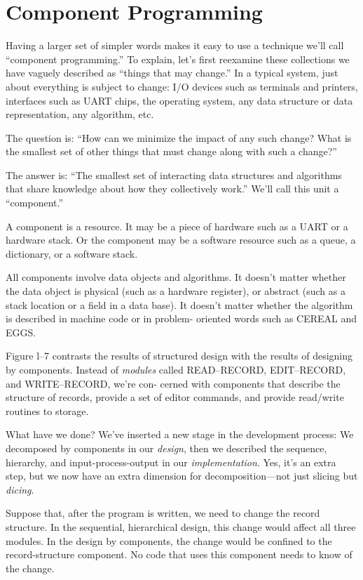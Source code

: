 \section*{Component Programming}

Having a larger set of simpler words makes it easy to use a technique
we'll call ``component programming.'' To explain, let's first reexamine
these collections we have vaguely described as ``things that may change.''
In a typical system, just about everything is subject to change: I/O
devices such as terminals and printers, interfaces such as UART chips,
the operating system, any data structure or data representation, any
algorithm, etc.

The question is: ``How can we minimize the impact of any such change?
What is the smallest set of other things that must change along with
such a change?''

The answer is: ``The smallest set of interacting data structures and
algorithms that share knowledge about how they collectively work.''
We'll call this unit a ``component.''

A component is a resource. It may be a piece of hardware such as a
UART or a hardware stack. Or the component may be a software resource
such as a queue, a dictionary, or a software stack.

All components involve data objects and algorithms. It doesn't matter
whether the data object is physical (such as a hardware register),
or abstract (such as a stack location or a field in a data base).
It doesn't matter whether the algorithm is described in machine code
or in problem- oriented words such as CEREAL and EGGS.

Figure l--7 contrasts the results of structured design with the results
of designing by components. Instead of \emph{modules} called READ--RECORD,
EDIT--RECORD, and WRITE--RECORD, we're con- cerned with components
that describe the structure of records, provide a set of editor commands,
and provide read/write routines to storage.

What have we done? We've inserted a new stage in the development process:
We decomposed by components in our \emph{design}, then we described
the sequence, hierarchy, and input-process-output in our \emph{implementation}.
Yes, it's an extra step, but we now have an extra dimension for decomposition---not
just slicing but \emph{dicing}.

Suppose that, after the program is written, we need to change the
record structure. In the sequential, hierarchical design, this change
would affect all three modules. In the design by components, the change
would be confined to the record-structure component. No code that
uses this component needs to know of the change.


